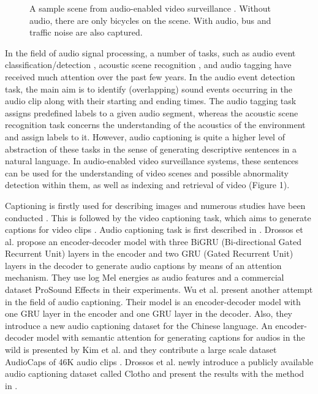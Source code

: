 \documentclass{article}
\begin{document}
\begin{figure}[t]
	\centering
	
\caption{A sample scene from audio-enabled video surveillance \cite{7952261}.
Without audio, there are only bicycles on the scene. With audio, bus and traffic noise are also captured.}
\end{figure}

In the field of audio signal processing, a number of tasks, such as audio event classification/detection \cite{6287923}, acoustic scene recognition \cite{7760424,8959049}, and audio tagging \cite{DBLP:journals/corr/KongXWP16} have received much attention over the past few years. In the audio event detection task, the main aim is to identify (overlapping) sound events occurring in the audio clip along with their starting and ending times. The audio tagging task assigns predefined labels to a given audio segment, whereas the acoustic scene recognition task concerns the understanding of the acoustics of the environment and assign labels to it. However, audio captioning is quite a higher level of abstraction of these tasks in the sense of generating descriptive sentences in a natural language. In audio-enabled video surveillance systems, these sentences can be used for the understanding of video scenes and possible abnormality detection within them, as well as indexing and retrieval of video (Figure 1).

Captioning is firstly used for describing images and numerous studies have been conducted \cite{DBLP:journals/corr/XuBKCCSZB15,DBLP:journals/corr/ChoCB15}. This is followed by the video captioning task, which aims to generate captions for video clips \cite{8356255,DBLP:journals/corr/abs-1804-00819}. Audio captioning task is first described in \cite{DBLP:journals/corr/DrossosAV17}. Drossos et al. propose an encoder-decoder model with three BiGRU (Bi-directional Gated Recurrent Unit) layers in the encoder and two GRU (Gated Recurrent Unit) layers in the decoder to generate audio captions by means of an attention mechanism. They use log Mel energies as audio features and a commercial dataset ProSound Effects \cite{prosound} in their experiments. Wu et al.\cite{DBLP:journals/corr/abs-1902-09254} present another attempt in the field of audio captioning. Their model is an encoder-decoder model with one GRU layer in the encoder and one GRU layer in the decoder. Also, they introduce a new audio captioning dataset for the Chinese language. An encoder-decoder model with semantic attention for generating captions for audios in the wild is presented by Kim et al. and they contribute a large scale dataset AudioCaps of 46K audio clips \cite{kim-etal-2019-audiocaps}. Drossos et al. newly introduce a publicly available audio captioning dataset called Clotho \cite{Drossos_2020} and present the results with the method in \cite{DBLP:journals/corr/DrossosAV17}.  
\end{document}
